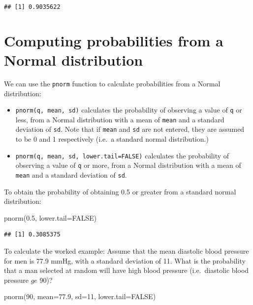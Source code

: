 \documentclass[
]{memoir}
\newenvironment{Shaded}{\begin{snugshade}}{\end{snugshade}}
\newcommand{\AttributeTok}[1]{\textcolor[rgb]{0.77,0.63,0.00}{#1}}
\newcommand{\ConstantTok}[1]{\textcolor[rgb]{0.00,0.00,0.00}{#1}}
\newcommand{\DecValTok}[1]{\textcolor[rgb]{0.00,0.00,0.81}{#1}}
\newcommand{\FloatTok}[1]{\textcolor[rgb]{0.00,0.00,0.81}{#1}}
\newcommand{\FunctionTok}[1]{\textcolor[rgb]{0.00,0.00,0.00}{#1}}
\newcommand{\NormalTok}[1]{#1}
\providecommand{\tightlist}{%
  \setlength{\itemsep}{0pt}\setlength{\parskip}{0pt}}
\begin{document}
\begin{verbatim}
## [1] 0.9035622
\end{verbatim}

\hypertarget{computing-probabilities-from-a-normal-distribution}{%
\section{Computing probabilities from a Normal distribution}\label{computing-probabilities-from-a-normal-distribution}}

We can use the \texttt{pnorm} function to calculate probabilities from a Normal distribution:

\begin{itemize}
\tightlist
\item
  \texttt{pnorm(q,\ mean,\ sd)} calculates the probability of observing a value of \texttt{q} or less, from a Normal distribution with a mean of \texttt{mean} and a standard deviation of \texttt{sd}. Note that if \texttt{mean} and \texttt{sd} are not entered, they are assumed to be 0 and 1 respectively (i.e.~a standard normal distribution.)
\item
  \texttt{pnorm(q,\ mean,\ sd,\ lower.tail=FALSE)} calculates the probability of observing a value of \texttt{q} or more, from a Normal distribution with a mean of \texttt{mean} and a standard deviation of \texttt{sd}.
\end{itemize}

To obtain the probability of obtaining 0.5 or greater from a standard normal distribution:

\begin{Shaded}
\begin{Highlighting}[]
\FunctionTok{pnorm}\NormalTok{(}\FloatTok{0.5}\NormalTok{, }\AttributeTok{lower.tail=}\ConstantTok{FALSE}\NormalTok{)}
\end{Highlighting}
\end{Shaded}

\begin{verbatim}
## [1] 0.3085375
\end{verbatim}

To calculate the worked example: Assume that the mean diastolic blood pressure for men is 77.9 mmHg, with a standard deviation of 11. What is the probability that a man selected at random will have high blood pressure (i.e.~diastolic blood pressure \(ge\) 90)?

\begin{Shaded}
\begin{Highlighting}[]
\FunctionTok{pnorm}\NormalTok{(}\DecValTok{90}\NormalTok{, }\AttributeTok{mean=}\FloatTok{77.9}\NormalTok{, }\AttributeTok{sd=}\DecValTok{11}\NormalTok{, }\AttributeTok{lower.tail=}\ConstantTok{FALSE}\NormalTok{)}
\end{Highlighting}
\end{Shaded}
\end{document}
